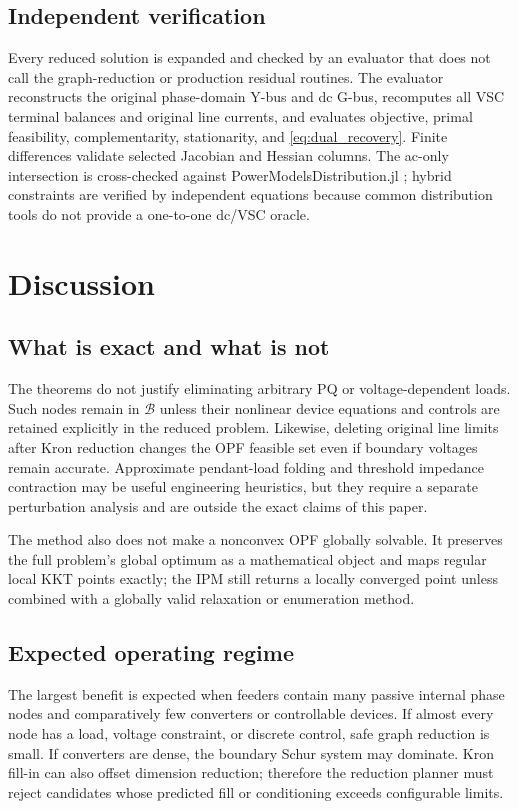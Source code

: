 \documentclass[journal,10pt]{IEEEtran}
\newcommand{\cB}{\mathcal{B}}
\begin{document}


\subsection{Independent verification}
Every reduced solution is expanded and checked by an evaluator that does not
call the graph-reduction or production residual routines.  The evaluator
reconstructs the original phase-domain Y-bus and dc G-bus, recomputes all VSC
terminal balances and original line currents, and evaluates objective, primal
feasibility, complementarity, stationarity, and \eqref{eq:dual_recovery}.
Finite differences validate selected Jacobian and Hessian columns.  The ac-only
intersection is cross-checked against PowerModelsDistribution.jl
\cite{fobes2020pmd}; hybrid constraints are verified by independent equations
because common distribution tools do not provide a one-to-one dc/VSC oracle.

\section{Discussion}
\subsection{What is exact and what is not}
The theorems do not justify eliminating arbitrary PQ or voltage-dependent loads.
Such nodes remain in $\cB$ unless their nonlinear device equations and controls
are retained explicitly in the reduced problem.  Likewise, deleting original
line limits after Kron reduction changes the OPF feasible set even if boundary
voltages remain accurate.  Approximate pendant-load folding and threshold
impedance contraction may be useful engineering heuristics, but they require a
separate perturbation analysis and are outside the exact claims of this paper.

The method also does not make a nonconvex OPF globally solvable.  It preserves
the full problem's global optimum as a mathematical object and maps regular
local KKT points exactly; the IPM still returns a locally converged point unless
combined with a globally valid relaxation or enumeration method.

\subsection{Expected operating regime}
The largest benefit is expected when feeders contain many passive internal
phase nodes and comparatively few converters or controllable devices.  If
almost every node has a load, voltage constraint, or discrete control, safe
graph reduction is small.  If converters are dense, the boundary Schur system
may dominate.  Kron fill-in can also offset dimension reduction; therefore the
reduction planner must reject candidates whose predicted fill or conditioning
exceeds configurable limits.
\end{document}
